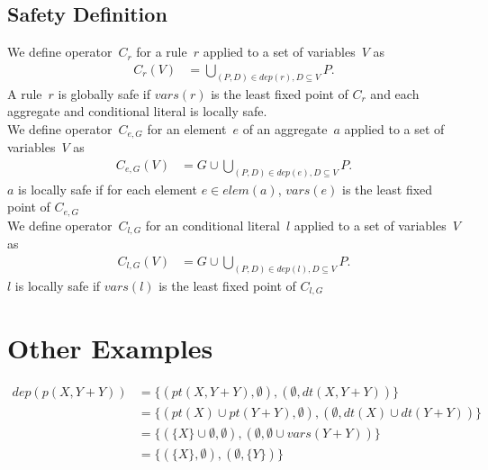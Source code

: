 \documentclass{article}
\newcommand{\set}[1]{\{#1\}}
\newcommand{\dep}[2]{\{(#1), (#2)\}}
\newcommand\Vars[1]{\mathit{vars}(#1)}
\newcommand\DP[1]{\mathit{dep}(#1)}
\newcommand\CheckOp[1]{C_{#1}}
\newcommand\CheckAp[2]{\CheckOp{#1}({#2})}
\begin{document}
	\subsection{Safety Definition}
	We define operator~$\CheckOp{r}$ for a rule~$r$ applied to a set of variables~$V$ as
	\begin{align*}
	\CheckAp{r}{V} &= \bigcup_{(P,D) \in \DP{r}, D \subseteq V} P.
	\end{align*}
	A rule~$r$ is globally safe if $\Vars{r}$ is the least fixed point of $\CheckOp{r}$ and each aggregate and conditional literal is locally safe.
	\\
	We define operator~$\CheckOp{e,G}$ for an element~$e$ of an aggregate~$a$ applied to a set of variables~$V$ as
	\begin{align*}
		\CheckAp{e,G}{V} &= G \cup \bigcup_{(P,D) \in \DP{e}, D \subseteq V} P.
	\end{align*}
	$a$ is locally safe if for each element $e \in elem(a)$, $\Vars{e}$ is the least fixed point of $\CheckOp{e,G}$
	\\
	We define operator~$\CheckOp{l,G}$ for an conditional literal~$l$ applied to a set of variables~$V$ as
	\begin{align*}
		\CheckAp{l,G}{V} &= G \cup \bigcup_{(P,D) \in \DP{l}, D \subseteq V} P.
	\end{align*}
	$l$ is locally safe if $\Vars{l}$ is the least fixed point of $\CheckOp{l,G}$
	\section{Other Examples}
	\begin{align*}
		dep(p(X,Y+Y)) &= \dep{pt(X,Y+Y), \emptyset}{\emptyset, dt(X,Y+Y)}
		\\ &= \dep{pt(X) \cup pt(Y+Y), \emptyset}{\emptyset, dt(X) \cup dt(Y+Y)}
		\\ &= \dep{\set{X} \cup \emptyset, \emptyset}{\emptyset, \emptyset \cup vars(Y+Y)}
		\\ &= \dep{\set{X}, \emptyset}{\emptyset, \set{Y}}
	\end{align*}
\end{document}
